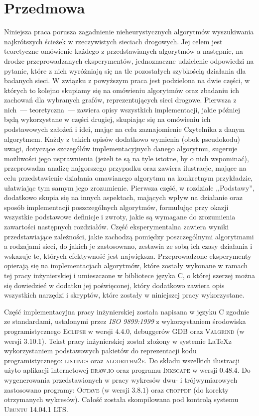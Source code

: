 \chapter{Przedmowa}

Niniejsza praca porusza zagadnienie nieheurystycznych algorytmów wyszukiwania najkrótszych ścieżek w rzeczywistych sieciach drogowych. Jej celem jest teoretyczne omówienie każdego z przedstawianych algorytmów a następnie, na drodze przeprowadzanych eksperymentów, jednoznaczne udzielenie odpowiedzi na pytanie, które z nich wyróżniają się na tle pozostałych szybkością działania dla badanych sieci. W związku z powyższym praca jest podzielona na dwie części, w których to kolejno skupiamy się na omówieniu algorytmów oraz zbadaniu ich zachowań dla wybranych grafów, reprezentujących sieci drogowe. Pierwsza z nich~--- teoretyczna~--- zawiera opisy wszystkich implementacji, jakie później będą wykorzystane w części drugiej, skupiając się na omówieniu ich podstawowych założeń i idei, mając na celu zaznajomienie Czytelnika z danym algorytmem. Każdy z takich opisów dodatkowo wymienia (obok pseudokodu) uwagi, dotyczące szczegółów implementacyjnych danego algorytmu, sugeruje możliwości jego usprawnienia (jeżeli te są na tyle istotne, by o nich wspominać), przeprowadza analizę najgorszego przypadku oraz zawiera ilustracje, mające na celu przedstawienie działania omawianego algorytmu na konkretnym przykładzie, ułatwiając tym samym jego zrozumienie. Pierwsza część, w rozdziale ,,Podstawy'', dodatkowo skupia się na innych aspektach, mających wpływ na działanie oraz sposób implementacji poszczególnych algorytmów, formułując przy okazji wszystkie podstawowe definicje i zwroty, jakie są wymagane do zrozumienia zawartości następnych rozdziałów. Część eksperymentalna zawiera wyniki przedstawiające zależności, jakie zachodzą pomiędzy poszczególnymi algorytmami a rodzajami sieci, do jakich je zastosowano, zestawia ze sobą ich czasy działania i wskazuje te, których efektywność jest największa. Przeprowadzone eksperymenty opierają się na implementacjach algorytmów, które zostały wykonane w ramach tej pracy inżynierskiej i umieszczone w bibliotece języka \textsc{C}, o której szerzej można się dowiedzieć w dodatku jej poświęconej, który dodatkowo zawiera opis wszystkich narzędzi i skryptów, które zostały w niniejszej pracy wykorzystane.

Część implementacyjna pracy inżynierskiej została napisana w języku \textsf{C} zgodnie ze standardami, ustalonymi przez \textit{\textsc{ISO 9899:1999}} z wykorzystaniem środowiska programistycznego \textsc{Eclipse} w wersji \textsc{$4.4.0$}, debuggerów \textsc{GDB} oraz \textsc{Valgrind} (w wersji \textsc{$3.10.1$}). Tekst pracy inżynierskiej został złożony w systemie \LaTeX z wykorzystaniem podstawowych pakietów do reprezentacji kodu programistycznego: \textsc{listings} oraz \textsc{algorithm2e}. Do składu wszelkich ilustracji użyto aplikacji internetowej \textsc{draw.io} oraz programu \textsc{Inkscape} w wersji \textsc{$0.48.4$}. Do wygenerowania przedstawionych w pracy wykresów dwu- i trójwymiarowych zastosowano programy: \textsc{Octave} (w wersji \textsc{$3.8.1$}) oraz \textsc{croppdf} (do korekty otrzymanych wykresów). Całość została skompilowana pod kontrolą systemu \textsc{Ubuntu 14.04.1 LTS}.

